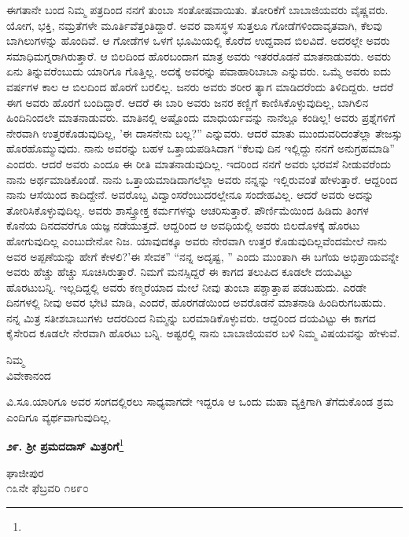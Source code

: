 ಈಗತಾನೇ ಬಂದ ನಿಮ್ಮ ಪತ್ರದಿಂದ ನನಗೆ ತುಂಬಾ ಸಂತೋಷವಾಯಿತು. ತೋರಿಕೆಗೆ ಬಾಬಾಜಿಯವರು ವೈಷ್ಣವರು. ಯೋಗ, ಭಕ್ತಿ, ನಮ್ರತೆಗಳೇ ಮೂರ್ತಿವೆತ್ತಂತಿದ್ದಾರೆ. ಅವರ ವಾಸಸ್ಥಳ ಸುತ್ತಲೂ ಗೋಡೆಗಳಿಂದಾವೃತವಾಗಿ, ಕೆಲವು ಬಾಗಿಲುಗಳನ್ನು ಹೊಂದಿವೆ. ಆ ಗೋಡೆಗಳ ಒಳಗೆ ಭೂಮಿಯಲ್ಲಿ ಕೊರೆದ ಉದ್ದವಾದ ಬಿಲವಿದೆ. ಅದರಲ್ಲೇ ಅವರು ಸಮಾಧಿಮಗ್ನರಾಗಿರುತ್ತಾರೆ. ಆ ಬಿಲದಿಂದ ಹೊರಬಂದಾಗ ಮಾತ್ರ ಅವರು ಇತರರೊಡನೆ ಮಾತನಾಡುವರು. ಅವರು ಏನು ತಿನ್ನುವರೆಂಬುದು ಯಾರಿಗೂ ಗೊತ್ತಿಲ್ಲ. ಅದಕ್ಕೆ ಅವರನ್ನು ಪವಾಹಾರಿಬಾಬಾ ಎನ್ನುವರು. ಒಮ್ಮೆ ಅವರು ಐದು ವರ್ಷಗಳ ಕಾಲ ಆ ಬಿಲದಿಂದ ಹೊರಗೆ ಬರಲಿಲ್ಲ. ಜನರು ಅವರು ಶರೀರ ತ್ಯಾಗ ಮಾಡಿದರೆಂದು ತಿಳಿದಿದ್ದರು. ಆದರೆ ಈಗ ಅವರು ಹೊರಗೆ ಬಂದಿದ್ದಾರೆ. ಆದರೆ ಈ ಬಾರಿ ಅವರು ಜನರ ಕಣ್ಣಿಗೆ ಕಾಣಿಸಿಕೊಳ್ಳುವುದಿಲ್ಲ, ಬಾಗಿಲಿನ ಹಿಂದಿನಿಂದಲೇ ಮಾತನಾಡುವರು. ಮಾತಿನಲ್ಲಿ ಅಷ್ಟೊಂದು ಮಾಧುರ್ಯವನ್ನು ನಾನೆಲ್ಲೂ ಕಂಡಿಲ್ಲ! ಅವರು ಪ್ರಶ್ನೆಗಳಿಗೆ ನೇರವಾಗಿ ಉತ್ತರಕೊಡುವುದಿಲ್ಲ, 'ಈ ದಾಸನೇನು ಬಲ್ಲ?'' ಎನ್ನುವರು. ಆದರೆ ಮಾತು ಮುಂದುವರಿದಂತೆಲ್ಲಾ ತೇಜಸ್ಸು ಹೊರಹೊಮ್ಮುವುದು. ನಾನು ಅವರನ್ನು ಬಹಳ ಒತ್ತಾಯಪಡಿಸಿದಾಗ ``ಕೆಲವು ದಿನ ಇಲ್ಲಿದ್ದು ನನಗೆ ಅನುಗ್ರಹಮಾಡಿ'' ಎಂದರು. ಆದರೆ ಅವರು ಎಂದೂ ಈ ರೀತಿ ಮಾತನಾಡುವುದಿಲ್ಲ. ಇದರಿಂದ ನನಗೆ ಅವರು ಭರವಸೆ ನೀಡುವರೆಂದು ನಾನು ಅರ್ಥಮಾಡಿಕೊಂಡೆ. ನಾನು ಒತ್ತಾಯಮಾಡಿದಾಗಲೆಲ್ಲಾ ಅವರು ನನ್ನನ್ನು ಇಲ್ಲಿರುವಂತೆ ಹೇಳುತ್ತಾರೆ. ಆದ್ದರಿಂದ ನಾನು ಆಸೆಯಿಂದ ಕಾದಿದ್ದೇನೆ. ಅವರೊಬ್ಬ ವಿದ್ವಾಂಸರೆಂಬುದರಲ್ಲೇನೂ ಸಂದೇಹವಿಲ್ಲ. ಆದರೆ ಅವರು ಅದನ್ನು ತೋರಿಸಿಕೊಳ್ಳುವುದಿಲ್ಲ. ಅವರು ಶಾಸ್ತ್ರೋಕ್ತ ಕರ್ಮಗಳನ್ನು ಆಚರಿಸುತ್ತಾರೆ. ಪೌರ್ಣಿಮೆಯಿಂದ ಹಿಡಿದು ತಿಂಗಳ ಕೊನೆಯ ದಿನದವರೆಗೂ ಯಜ್ಞ ನಡೆಯುತ್ತದೆ. ಆದ್ದರಿಂದ ಆ ಅವಧಿಯಲ್ಲಿ ಅವರು ಬಿಲದೊಳಕ್ಕೆ ಹೊರಟು ಹೋಗುವುದಿಲ್ಲ ಎಂಬುದೇನೋ ನಿಜ. ಯಾವುದಕ್ಕೂ ಅವರು ನೇರವಾಗಿ ಉತ್ತರ ಕೊಡುವುದಿಲ್ಲವೆಂದಮೇಲೆ ನಾನು ಅವರ ಅಪ್ಪಣೆಯನ್ನು ಹೇಗೆ ಕೇಳಲಿ?'ಈ ಸೇವಕ'' “ನನ್ನ ಅದೃಷ್ಟ, '' ಎಂದು ಮುಂತಾಗಿ ಈ ಬಗೆಯ ಅಭಿಪ್ರಾಯವನ್ನೇ ಅವರು ಹೆಚ್ಚು ಹೆಚ್ಚು ಸೂಚಿಸಿರುತ್ತಾರೆ. ನಿಮಗೆ ಮನಸ್ಸಿದ್ದರೆ ಈ ಕಾಗದ ತಲುಪಿದ ಕೂಡಲೇ ದಯವಿಟ್ಟು ಹೊರಟುಬನ್ನಿ. ಇಲ್ಲದಿದ್ದಲ್ಲಿ ಅವರು ಕಣ್ಮರೆಯಾದ ಮೇಲೆ ನೀವು ತುಂಬಾ ಪಶ್ಚಾತ್ತಾಪ ಪಡಬಹುದು. ಎರಡೇ ದಿನಗಳಲ್ಲಿ ನೀವು ಅವರ ಭೇಟಿ ಮಾಡಿ, ಎಂದರೆ, ಹೊರಗಡೆಯಿಂದ ಅವರೊಡನೆ ಮಾತನಾಡಿ ಹಿಂದಿರುಗಬಹುದು. ನನ್ನ ಮಿತ್ರ ಸತೀಶಬಾಬುಗಳು ಆದರದಿಂದ ನಿಮ್ಮನ್ನು ಬರಮಾಡಿಕೊಳ್ಳುವರು. ಆದ್ದರಿಂದ ದಯವಿಟ್ಟು ಈ ಕಾಗದ ಕೈಸೇರಿದ ಕೂಡಲೇ ನೇರವಾಗಿ ಹೊರಟು ಬನ್ನಿ. ಅಷ್ಟರಲ್ಲಿ ನಾನು ಬಾಬಾಜಿಯವರ ಬಳಿ ನಿಮ್ಮ ವಿಷಯವನ್ನು ಹೇಳುವೆ.

{\flushright
ನಿಮ್ಮ\\ವಿವೇಕಾನಂದ\par}

ವಿ.ಸೂ.\enginline{-}ಯಾರಿಗೂ ಅವರ ಸಂಗದಲ್ಲಿರಲು ಸಾಧ್ಯವಾಗದೇ ಇದ್ದರೂ ಆ ಒಂದು ಮಹಾ ವ್ಯಕ್ತಿಗಾಗಿ ತೆಗೆದುಕೊಂಡ ಶ್ರಮ ಎಂದಿಗೂ ವ್ಯರ್ಥವಾಗುವುದಿಲ್ಲ.

\begin{center}
\textbf{೨೯. ಶ‍್ರೀ ಪ್ರಮದದಾಸ್ ಮಿತ್ರರಿಗೆ}\footnote{}
\end{center}

\begin{flushright}
ಘಾಜೀಪುರ\\೧೩ನೇ ಫೆಬ್ರವರಿ ೧೮೯೦
\end{flushright}

